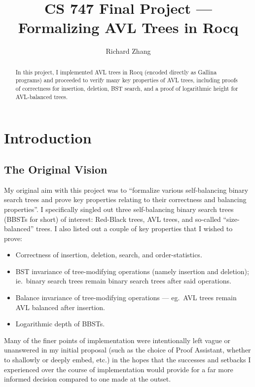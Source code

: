 \documentclass[acmsmall, authorversion, nonacm, overload]{acmart}
\begin{document}
\title{CS 747 Final Project --- Formalizing AVL Trees in Rocq}
\author{Richard Zhang}

\begin{abstract}
  In this project, I implemented AVL trees in Rocq (encoded directly as Gallina programs)
  and proceeded to verify many key properties of AVL trees, including
  proofs of correctness for insertion, deletion, BST search,
  and a proof of logarithmic height for AVL-balanced trees.
\end{abstract}

\maketitle

\section{Introduction}

\subsection{The Original Vision}
My original aim with this project was to ``formalize various self-balancing binary search trees
and prove key properties relating to their correctness and balancing properties''.
I specifically singled out three self-balancing binary search trees (BBSTs for short) of interest:
Red-Black trees, AVL trees, and so-called ``size-balanced'' trees.
I also listed out a couple of key properties that I wished to prove:
\begin{itemize}
\item Correctness of insertion, deletion, search, and order-statistics.
\item BST invariance of tree-modifying operations (namely insertion and deletion); ie.\
  binary search trees remain binary search trees after said operations.
\item Balance invariance of tree-modifying operations --- eg.\ AVL trees remain AVL balanced after insertion.
\item Logarithmic depth of BBSTs.
\end{itemize}
Many of the finer points of implementation were intentionally left vague or unanswered in my initial proposal
(such as the choice of Proof Assistant, whether to shallowly or deeply embed, etc.) in the hopes that
the successes and setbacks I experienced over the course of implementation would provide for
a far more informed decision compared to one made at the outset.
\end{document}
